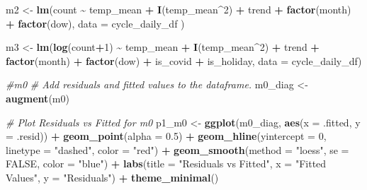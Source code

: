 \documentclass[
]{article}
\newenvironment{Shaded}{\begin{snugshade}}{\end{snugshade}}
\newcommand{\AttributeTok}[1]{\textcolor[rgb]{0.13,0.29,0.53}{#1}}
\newcommand{\CommentTok}[1]{\textcolor[rgb]{0.56,0.35,0.01}{\textit{#1}}}
\newcommand{\ConstantTok}[1]{\textcolor[rgb]{0.56,0.35,0.01}{#1}}
\newcommand{\DecValTok}[1]{\textcolor[rgb]{0.00,0.00,0.81}{#1}}
\newcommand{\FloatTok}[1]{\textcolor[rgb]{0.00,0.00,0.81}{#1}}
\newcommand{\FunctionTok}[1]{\textcolor[rgb]{0.13,0.29,0.53}{\textbf{#1}}}
\newcommand{\NormalTok}[1]{#1}
\newcommand{\OtherTok}[1]{\textcolor[rgb]{0.56,0.35,0.01}{#1}}
\newcommand{\SpecialCharTok}[1]{\textcolor[rgb]{0.81,0.36,0.00}{\textbf{#1}}}
\newcommand{\StringTok}[1]{\textcolor[rgb]{0.31,0.60,0.02}{#1}}
\begin{document}
\begin{Shaded}
\begin{Highlighting}[]
\NormalTok{m2 }\OtherTok{\textless{}{-}} \FunctionTok{lm}\NormalTok{(count }\SpecialCharTok{\textasciitilde{}}\NormalTok{ temp\_mean }\SpecialCharTok{+} \FunctionTok{I}\NormalTok{(temp\_mean}\SpecialCharTok{\^{}}\DecValTok{2}\NormalTok{)  }\SpecialCharTok{+}\NormalTok{ trend }\SpecialCharTok{+} 
           \FunctionTok{factor}\NormalTok{(month) }\SpecialCharTok{+} \FunctionTok{factor}\NormalTok{(dow), }\AttributeTok{data =}\NormalTok{ cycle\_daily\_df )}

\NormalTok{m3 }\OtherTok{\textless{}{-}} \FunctionTok{lm}\NormalTok{(}\FunctionTok{log}\NormalTok{(count}\SpecialCharTok{+}\DecValTok{1}\NormalTok{) }\SpecialCharTok{\textasciitilde{}}\NormalTok{ temp\_mean }\SpecialCharTok{+} \FunctionTok{I}\NormalTok{(temp\_mean}\SpecialCharTok{\^{}}\DecValTok{2}\NormalTok{) }\SpecialCharTok{+}\NormalTok{ trend }\SpecialCharTok{+} 
               \FunctionTok{factor}\NormalTok{(month) }\SpecialCharTok{+} \FunctionTok{factor}\NormalTok{(dow)  }\SpecialCharTok{+}\NormalTok{ is\_covid }\SpecialCharTok{+}\NormalTok{ is\_holiday, }\AttributeTok{data =}\NormalTok{ cycle\_daily\_df)}

\CommentTok{\#m0}
\CommentTok{\# Add residuals and fitted values to the dataframe.}
\NormalTok{m0\_diag }\OtherTok{\textless{}{-}} \FunctionTok{augment}\NormalTok{(m0)}

\CommentTok{\# Plot Residuals vs Fitted for m0}
\NormalTok{p1\_m0 }\OtherTok{\textless{}{-}} \FunctionTok{ggplot}\NormalTok{(m0\_diag, }\FunctionTok{aes}\NormalTok{(}\AttributeTok{x =}\NormalTok{ .fitted, }\AttributeTok{y =}\NormalTok{ .resid)) }\SpecialCharTok{+}
  \FunctionTok{geom\_point}\NormalTok{(}\AttributeTok{alpha =} \FloatTok{0.5}\NormalTok{) }\SpecialCharTok{+}
  \FunctionTok{geom\_hline}\NormalTok{(}\AttributeTok{yintercept =} \DecValTok{0}\NormalTok{, }\AttributeTok{linetype =} \StringTok{"dashed"}\NormalTok{, }\AttributeTok{color =} \StringTok{"red"}\NormalTok{) }\SpecialCharTok{+}
  \FunctionTok{geom\_smooth}\NormalTok{(}\AttributeTok{method =} \StringTok{"loess"}\NormalTok{, }\AttributeTok{se =} \ConstantTok{FALSE}\NormalTok{, }\AttributeTok{color =} \StringTok{"blue"}\NormalTok{) }\SpecialCharTok{+}
  \FunctionTok{labs}\NormalTok{(}\AttributeTok{title =} \StringTok{"Residuals vs Fitted"}\NormalTok{,}
       \AttributeTok{x =} \StringTok{"Fitted Values"}\NormalTok{,}
       \AttributeTok{y =} \StringTok{"Residuals"}\NormalTok{) }\SpecialCharTok{+}
  \FunctionTok{theme\_minimal}\NormalTok{()}


\end{Highlighting}
\end{Shaded}
\end{document}

